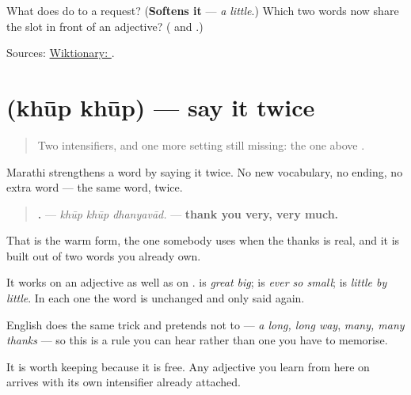 \begin{tcolorbox}[breakable,colback=teal!4,colframe=teal!35!black,title={Before you move on}]
What does \textbf{} do to a request? (\textbf{Softens it} — \emph{a little}.) Which two words now share the slot in front of an adjective? (\textbf{} and \textbf{}.)

Sources: \href{https://en.wiktionary.org/wiki/\%E0\%A4\%9C\%E0\%A4\%B0\%E0\%A4\%BE}{Wiktionary: }.
\end{tcolorbox}
\section[\texorpdfstring{\mr{खूप} \mr{खूप} (khūp khūp)}{खूप खूप (khūp khūp)}]{  (khūp khūp) — say it twice}

\label{lesson:MR-C53-reduplication}



\begin{quote}
Two intensifiers, and one more setting still missing: the one above \textbf{}.
\end{quote}

\begin{grammarlens}[title={Grammar Lens: repetition is a degree}]
Marathi strengthens a word by saying it twice. No new vocabulary, no ending, no extra word — the same word, twice.

\begin{quote}
\textbf{  .} — \emph{khūp khūp dhanyavād.} — \textbf{thank you very, very much.}
\end{quote}

That is the warm form, the one somebody uses when the thanks is real, and it is built out of two words you already own.

It works on an adjective as well as on \textbf{}. \textbf{ } is \emph{great big}; \textbf{ } is \emph{ever so small}; \textbf{ } is \emph{little by little}. In each one the word is unchanged and only said again.

English does the same trick and pretends not to — \emph{a long, long way}, \emph{many, many thanks} — so this is a rule you can hear rather than one you have to memorise.

It is worth keeping because it is free. Any adjective you learn from here on arrives with its own intensifier already attached.
\end{grammarlens}

